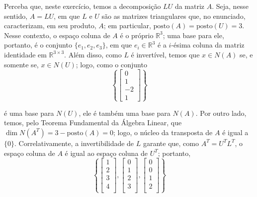 \documentclass[leqno]{article}
\begin{document}
\begin{enumerate}
\begin{sol} 
	Perceba que, neste exercício, temos a decomposição $LU$ da matriz $A$. Seja, nesse sentido, $A = LU$, em que $L$ e $U$ são as matrizes triangulares que, no enunciado, caracterizam, em seu produto, $A$; em particular, $\mathrm{posto}(A) = \mathrm{posto}(U) = 3$. Nesse contexto, o espaço coluna de $A$ é o próprio $\mathbb{R}^{3}$; uma base para ele, portanto, é o conjunto $\{e_{1}, e_{2}, e_{3}\}$, em que $e_{i} \in \mathbb{R}^{3}$ é a $i$-ésima coluna da matriz identidade em $\mathbb{R}^{3 \times 3}$. Além disso, como $L$ é invertível, temos que $x \in N(A)$ se, e somente se, $x \in N(U)$; logo, como o conjunto 
	\begin{equation*} 
		\left\{  
			\begin{bmatrix} 
				0 \\ 
				1 \\ 
				-2 \\ 
				1 
			\end{bmatrix} 
		\right\} 
	\end{equation*} 

	\noindent é uma base para $N(U)$, ele é também uma base para $N(A)$. Por outro lado, temos, pelo Teorema Fundamental da Álgebra Linear, que $\dim N(A^{T}) = 3 - \mathrm{posto}(A) = 0$; logo, o núcleo da transposta de $A$ é igual a $\{0\}$. Correlativamente, a invertibilidade de $L$ garante que, como $A^{T} = U^{T}L^{T}$, o espaço coluna de $A$ é igual ao espaço coluna de $U^{T}$; portanto, 
	\begin{equation*} 
		\left\{ 
		\begin{bmatrix} 
			1 \\ 
			2 \\ 
			3 \\ 
			4 \\ 
		\end{bmatrix}, 
		\begin{bmatrix} 
			0 \\ 
			1 \\ 
			2 \\ 
			3 \\ 
		\end{bmatrix}, 
		\begin{bmatrix} 
			0 \\ 
			0 \\ 
			1 \\ 
			2 \\ 
		\end{bmatrix} 
		\right\}  
	\end{equation*} 


\end{sol}
\end{enumerate}
\end{document}
